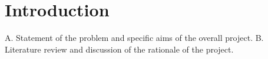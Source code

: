 \setcounter{section}{0}
\section{Introduction}\label{sec:introduction}

A. Statement of the problem and specific aims of the overall project.
B. Literature review and discussion of the rationale of the project.
~\cite{jones2009}
